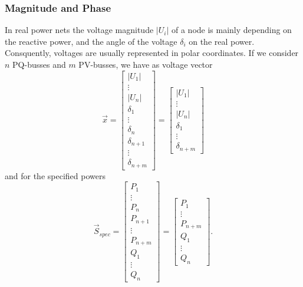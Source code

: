 \subsubsection{Magnitude and Phase}
In real power nets the voltage magnitude $|U_i|$ of a node is mainly depending on the reactive power, and the angle of the voltage $\delta_i$ on the real power. Consquently, voltages are usually represented in polar coordinates. If we consider $n$ PQ-busses and $m$ PV-busses, we have as voltage vector 
\begin{equation}
	\vec x = 
	\begin{bmatrix}
		|U_1| \\
		\vdots \\
		|U_n| \\
		\delta_1 \\
		\vdots \\
		\delta_n \\
		\delta_{n + 1} \\
		\vdots \\
		\delta_{n + m} 
	\end{bmatrix} = 	
	\begin{bmatrix}
		|U_1| \\
		\vdots \\
		|U_n| \\
		\delta_1 \\
		\vdots \\
		\delta_{n + m} 
	\end{bmatrix}
\end{equation}
and for the specified powers
\begin{equation}
	\vec S_{spec} = 
	\begin{bmatrix}
		P_1 \\
		\vdots \\
		P_n \\
		P_{n + 1} \\
		\vdots \\
		P_{n + m} \\
		Q_1 \\
		\vdots \\
		Q_n
	\end{bmatrix} = 
	\begin{bmatrix}
		P_1 \\
		\vdots \\
		P_{n + m} \\
		Q_1 \\
		\vdots \\
		Q_n
	\end{bmatrix}.
\end{equation}

